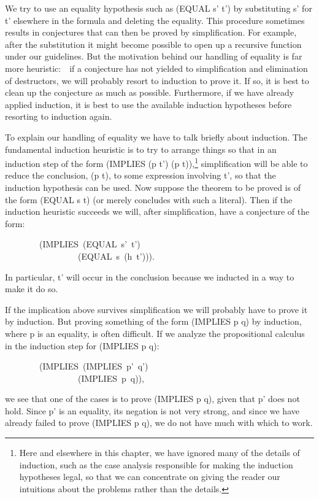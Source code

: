 \documentclass[10pt]{book}
\newenvironment{pubasis}{\begin{flushleft}}{\end{flushleft}}
\begin{document}
We try to use an equality hypothesis such as (EQUAL s' t') by substituting s' for t'
elsewhere in the formula and deleting the equality.
This procedure sometimes results in conjectures that can
then be proved by simplification.  For example, after the substitution
it might become possible to open up a recursive function under our guidelines.
But the motivation behind our handling of
equality is far more heuristic:~~if a conjecture has not yielded to
simplification and elimination of destructors, we will probably
resort to induction to prove it.  If so, it is best
to clean up the conjecture as much as possible.  
Furthermore, if we have already applied induction, it is best to use
the available induction hypotheses before resorting to induction again.

To explain our handling of equality we have to talk briefly about induction.
The fundamental induction heuristic is to try to arrange things so
that in an induction step of the form (IMPLIES (p t') (p t)),\footnote{Here and elsewhere in this chapter, we have ignored many of the details of induction, such as the case analysis responsible for making the induction hypotheses legal, so that we can concentrate on giving the reader our intuitions about the problems rather than the details.} simplification
will be able to reduce the conclusion, (p t), to some expression involving t', so
that the induction hypothesis can be used.  Now suppose the theorem to
be proved is of the form (EQUAL s t) (or merely concludes with such a literal).
Then if the induction heuristic succeeds we will, after simplification,
have a conjecture of the form:

\begin{pubasis}
~~~~~~~~(IMPLIES~(EQUAL~s'~t')\\
~~~~~~~~~~~~~~~~~(EQUAL~s~(h~t'))).\\
\end{pubasis}
In particular, t'
will occur in the conclusion because we inducted in a way to make it do so.

If the implication above survives simplification we will probably have
to prove it by induction.  But proving something of the
form (IMPLIES p q) by induction, where p is an equality, is often difficult.  If we
analyze the propositional calculus in the  induction step for (IMPLIES p q):
\begin{pubasis}
~~~~~~~~(IMPLIES~(IMPLIES~p'~q')\\
~~~~~~~~~~~~~~~~~(IMPLIES~p~q)),\\
\end{pubasis}
we see that one of the cases is to prove (IMPLIES p q), given that p' does not
hold.  Since p' is an equality, its negation is not very strong, and since
we have already failed to prove (IMPLIES p q), we do not have much with which to work.
\end{document}
